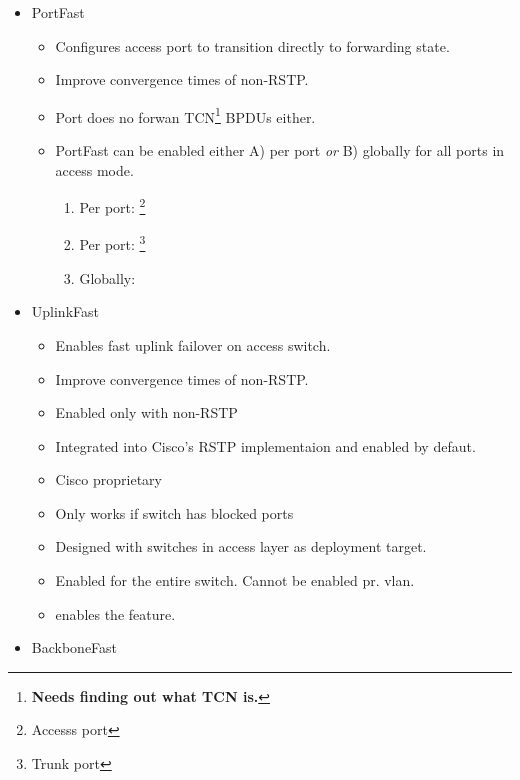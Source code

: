\begin{itemize}
    \item PortFast
    \begin{itemize}
        \item Configures access port to transition directly to forwarding state.
        \item Improve convergence times of non-RSTP.
        \item Port does no forwan TCN\footnote{\textbf{Needs finding out what TCN is.}} BPDUs either.
        \item PortFast can be enabled either A) per port \textit{or} B) globally for all ports in access mode.
        \begin{enumerate}
            \item Per port: \footnote{Accesss port}\\
            \item Per port: \footnote{Trunk port}\\
            \item Globally:\\
        \end{enumerate}
    \end{itemize}
    \item UplinkFast
    \begin{itemize}
        \item Enables fast uplink failover on access switch.
        \item Improve convergence times of non-RSTP.
        \item Enabled only with non-RSTP
        \item Integrated into Cisco's RSTP implementaion and enabled by defaut.
        \item Cisco proprietary
        \item Only works if switch has blocked ports
        \item Designed with switches in access layer as deployment target.
        \item Enabled for the entire switch. Cannot be enabled pr. vlan.
        \item {} enables the feature.
    \end{itemize}
    \item BackboneFast
    \begin{itemize}

\end{itemize}
\end{itemize}
